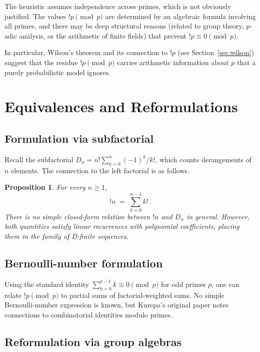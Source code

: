 \documentclass[12pt,a4paper]{amsart}
\newtheorem{proposition}[theorem]{Proposition}
\theoremstyle{definition}
\begin{document}
The heuristic assumes independence across primes, which is not obviously
justified.
The values $!p \pmod p$ are determined by an algebraic formula involving
all primes, and there may be deep structural reasons (related to group theory,
$p$-adic analysis, or the arithmetic of finite fields) that prevent $!p
\equiv 0 \pmod p$.

In particular, Wilson's theorem and its connection to $!p$ (see
Section~\ref{sec:wilson}) suggest that the residue $!p \pmod p$ carries
arithmetic information about $p$ that a purely probabilistic model ignores.

\section{Equivalences and Reformulations}
\label{sec:equivalences}

\subsection{Formulation via subfactorial}

Recall the subfactorial $D_n = n! \sum_{k=0}^n (-1)^k/k!$,
which counts derangements of $n$ elements.
The connection to the left factorial is as follows.

\begin{proposition}
For every $n \geq 1$,
\[
  !n \;=\; \sum_{k=0}^{n-1} k!\,.
\]
There is no simple closed-form relation between $!n$ and $D_n$ in general.
However, both quantities satisfy linear recurrences with polynomial
coefficients, placing them in the family of \emph{D-finite sequences}.
\end{proposition}

\subsection{Bernoulli-number formulation}

Using the standard identity $\sum_{k=0}^{p-1} k \equiv 0 \pmod p$
for odd primes $p$, one can relate $!p \pmod p$ to partial sums of
factorial-weighted sums.
No simple Bernoulli-number expression is known, but Kurepa's original paper
notes connections to combinatorial identities modulo primes.

\subsection{Reformulation via group algebras}
\end{document}
